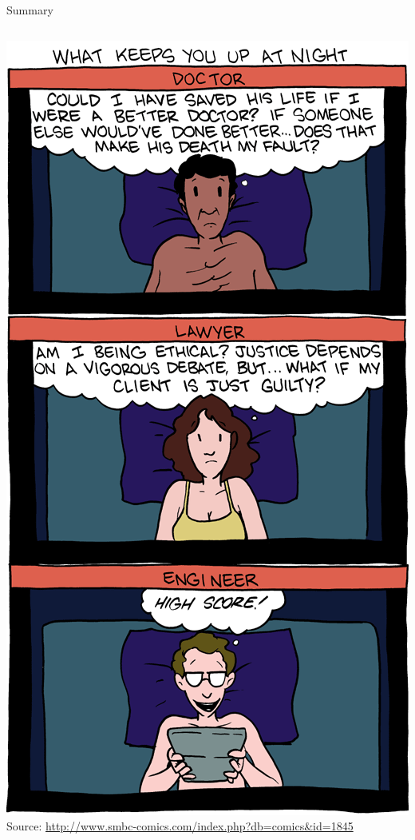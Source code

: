 \begin{frame}{Summary}
\begin{columns}[c]
\begin{column}{0.45\textwidth}
\begin{center}
        \includegraphics[scale=0.2]{figures/smbc}\\
        \tiny{Source: \url{http://www.smbc-comics.com/index.php?db=comics&id=1845}}
      \end{center}
    \end{column}
  \end{columns}
\end{frame}


